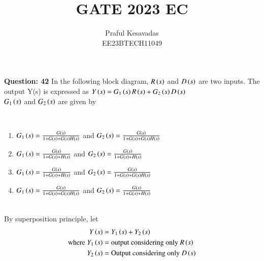 \documentclass[journal,12pt,onecolumn]{IEEEtran}
\theoremstyle{remark}
\begin{document}
\let\vec\mathbf







\bigskip

\renewcommand{\thefigure}{\theenumi}
\renewcommand{\thetable}{\theenumi}


\title{GATE 2023 EC}
\author{Praful Kesavadas\\ EE23BTECH11049}
\maketitle

\textbf{Question: 42} In the following block diagram, $R\left(s\right)$ and $D\left(s\right)$ are two inputs. The output Y(s) is expressed as $Y\left(s\right) = G_1\left(s\right)R\left(s\right) + G_2\left(s\right)D\left(s\right)$\\
$G_1\left(s\right)$ and $G_2\left(s\right)$ are given by\\
\begin{figure}[htbp!]
\centering

\end{figure}\\
\begin{enumerate}[label=\alph*)]
\item $G_1\left(s\right) = \frac{G\left(s\right)}{1+G\left(s\right)+G\left(s\right)H\left(s\right)}$ and $G_2\left(s\right) = \frac{G\left(s\right)}{1+ G\left(s\right)+G\left(s\right)H\left(s\right)}$\\
\item $G_1\left(s\right) = \frac{G\left(s\right)}{1+G\left(s\right)+H\left(s\right)}$ and $G_2\left(s\right) = \frac{G\left(s\right)}{1+ G\left(s\right)+H\left(s\right)}$\\
\item $G_1\left(s\right) = \frac{G\left(s\right)}{1+G\left(s\right)+H\left(s\right)}$ and $G_2\left(s\right) = \frac{G\left(s\right)}{1+ G\left(s\right)+G\left(s\right)H\left(s\right)}$\\
\item $G_1\left(s\right) = \frac{G\left(s\right)}{1+G\left(s\right)+G\left(s\right)H\left(s\right)}$ and $G_2\left(s\right) = \frac{G\left(s\right)}{1+ G\left(s\right)+H\left(s\right)}$\\
\end{enumerate}
\solution\\
\fi
By superposition principle, let\\ 
\begin{align*}Y\left(s\right)&= Y_1\left(s\right) + Y_2\left(s\right)\\ \text{where } Y_1\left(s\right)&= \text{output considering only } R\left(s\right)\\ Y_2\left(s\right) &= \text{Output considering only } D\left(s\right)
\end{align*}
\end{document}
